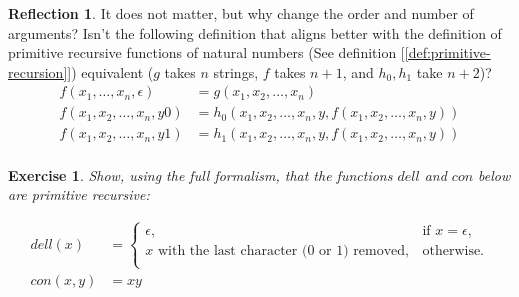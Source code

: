 \documentclass[11pt]{book}
\theoremstyle{definition}
\theoremstyle{plain}
\newtheorem{exercise}{Exercise}[chapter]
\theoremstyle{problemstyle}
\theoremstyle{remark}
\theoremstyle{definition}
\newtheorem{reflection}{Reflection}
\begin{document}
\begin{reflection}
    It does not matter, but why change the order and number of arguments? Isn't the following definition that aligns better with the definition of primitive recursive functions of natural numbers (See definition [\ref{def:primitive-recursion}]) equivalent ($g$ takes $n$ strings, $f$ takes $n+1$, and $h_0,h_1$ take $n+2$)? 
    \begin{equation}
        \label{eq:alt-primitive-recursive-functions-of-strings}
        \begin{aligned}
            f(x_1,\dots,x_{n},\epsilon)&=g(x_1,x_2,\dots,x_{n})\\
            f(x_1,x_2,\dots,x_n,y0)&=h_0(x_1,x_2,\dots,x_n,y,f(x_1,x_2,\dots,x_n,y))\\
            f(x_1,x_2,\dots,x_n,y1)&=h_1(x_1,x_2,\dots,x_n,y,f(x_1,x_2,\dots,x_n,y))\\
        \end{aligned}
    \end{equation}
\end{reflection}


\begin{exercise}
    Show, using the full formalism, that the functions $dell$ and $con$ below are primitive recursive:
\end{exercise}
    \begin{equation}
        \label{eq:dell-con}
        \begin{aligned}
            dell(x)&=\begin{cases}
            \epsilon, & \text{if $x=\epsilon$,}\\
            x\text{ with the last character (0 or 1) removed}, & \text{otherwise.}\\
		 \end{cases}\\
            con(x,y)&=xy
        \end{aligned}
    \end{equation}
\end{document}
